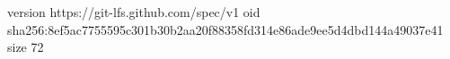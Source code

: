 version https://git-lfs.github.com/spec/v1
oid sha256:8ef5ac7755595c301b30b2aa20f88358fd314e86ade9ee5d4dbd144a49037e41
size 72
